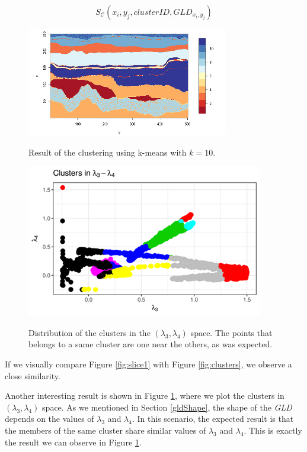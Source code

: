 \documentclass[11pt]{article}
\begin{document}
\begin{equation}\label{eq:clustersresult}
S_{\mathcal{C}}(x_{i},y_{j},clusterID, GLD_{x_{i},y_{j}})
\end{equation}

\begin{figure}[!ht]
\vspace{-2cm}
\begin{multicols}{2}
    \centering
        \includegraphics{figs/clusters_image.png}
    \caption{Result of the clustering using k-means with
    $k=10$.}
    \label{fig:clusters}
    \centering
    \includegraphics{figs/clusters_l3_l4.png}
    \caption{Distribution of the clusters in the $(\lambda_{3}, \lambda_{4})$ space. The points that belongs to a same cluster are one near the others, as was expected.}
    \label{fig:clusters_lambda3_lambda4_space}
\end{multicols}
\end{figure}


If we visually compare Figure \ref{fig:slice1} with Figure \ref{fig:clusters}, we observe a close similarity. 

Another interesting result is shown in Figure \ref{fig:clusters_lambda3_lambda4_space}, where we plot the clusters in $(\lambda_{3}, \lambda_{4})$ space. As we mentioned in Section \ref{gldShape}, the shape of the \textit{GLD} depends on the values of $\lambda_{3}$ and $\lambda_{4}$. In this scenario, the expected result is that the members of the same cluster share similar values of $\lambda_{3}$ and $\lambda_{4}$. This is exactly the result we can observe in Figure \ref{fig:clusters_lambda3_lambda4_space}. 
\end{document}
